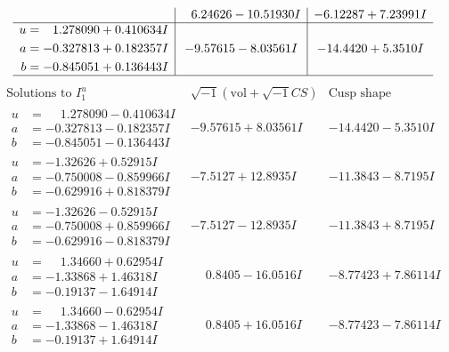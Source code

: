 \documentclass[1p]{elsarticle_modified}
\theoremstyle{definition}
\newcommand{\I}{\sqrt{-1}}
\begin{document}
$$\begin{array}{c|c|c}
 & \phantom{-}6.24626 - 10.51930 I & -6.12287 + 7.23991 I \\ \hline\begin{aligned}
u &= \phantom{-}1.278090 + 0.410634 I \\
a &= -0.327813 + 0.182357 I \\
b &= -0.845051 + 0.136443 I\end{aligned}
 & -9.57615 - 8.03561 I & -14.4420 + 5.3510 I\\
 \hline 
 \end{array}$$\newpage$$\begin{array}{c|c|c}  
\text{Solutions to }I^u_{1}& \I (\text{vol} + \sqrt{-1}CS) & \text{Cusp shape}\\
 \hline 
\begin{aligned}
u &= \phantom{-}1.278090 - 0.410634 I \\
a &= -0.327813 - 0.182357 I \\
b &= -0.845051 - 0.136443 I\end{aligned}
 & -9.57615 + 8.03561 I & -14.4420 - 5.3510 I \\ \hline\begin{aligned}
u &= -1.32626 + 0.52915 I \\
a &= -0.750008 - 0.859966 I \\
b &= -0.629916 + 0.818379 I\end{aligned}
 & -7.5127 + 12.8935 I & -11.3843 - 8.7195 I \\ \hline\begin{aligned}
u &= -1.32626 - 0.52915 I \\
a &= -0.750008 + 0.859966 I \\
b &= -0.629916 - 0.818379 I\end{aligned}
 & -7.5127 - 12.8935 I & -11.3843 + 8.7195 I \\ \hline\begin{aligned}
u &= \phantom{-}1.34660 + 0.62954 I \\
a &= -1.33868 + 1.46318 I \\
b &= -0.19137 - 1.64914 I\end{aligned}
 & \phantom{-}0.8405 - 16.0516 I & -8.77423 + 7.86114 I \\ \hline\begin{aligned}
u &= \phantom{-}1.34660 - 0.62954 I \\
a &= -1.33868 - 1.46318 I \\
b &= -0.19137 + 1.64914 I\end{aligned}
 & \phantom{-}0.8405 + 16.0516 I & -8.77423 - 7.86114 I \\ \hline\begin{aligned}

\end{aligned}
\end{array}$$
\end{document}
